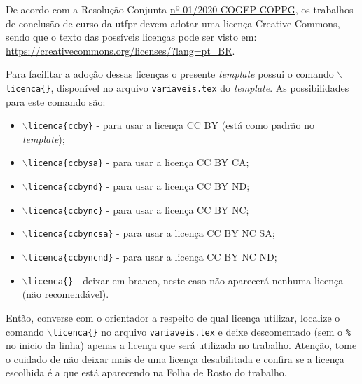 De acordo com a Resolução Conjunta \href{https://sei.utfpr.edu.br/sei/publicacoes/controlador_publicacoes.php?acao=publicacao_visualizar&id_documento=1811618&id_orgao_publicacao=0}{nº 01/2020 COGEP-COPPG}, os trabalhos de conclusão de curso da \gls{utfpr} devem adotar uma licença Creative Commons, sendo que o texto das possíveis licenças pode ser visto em: \url{https://creativecommons.org/licenses/?lang=pt_BR}.

Para facilitar a adoção dessas licenças o presente \textit{template} possui o comando \texttt{$\backslash$licenca\{\}}, disponível no arquivo \texttt{variaveis.tex} do \textit{template}. As possibilidades para este comando são:

\begin{itemize}
    \item \texttt{$\backslash$licenca\{ccby\}} - para usar a licença CC BY (está como padrão no \textit{template}); 
    \item \texttt{$\backslash$licenca\{ccbysa\}} - para usar a licença CC BY CA;
    \item \texttt{$\backslash$licenca\{ccbynd\}} - para usar a licença CC BY ND;
    \item \texttt{$\backslash$licenca\{ccbync\}} - para usar a licença CC BY NC;
    \item \texttt{$\backslash$licenca\{ccbyncsa\}} - para usar a licença CC BY NC SA;
    \item \texttt{$\backslash$licenca\{ccbyncnd\}} - para usar a licença CC BY NC ND;
    \item \texttt{$\backslash$licenca\{\}} - deixar em branco, neste caso não aparecerá nenhuma licença (não recomendável).
\end{itemize}

Então, converse com o orientador a respeito de qual licença utilizar, localize o comando \texttt{$\backslash$licenca\{\}} no arquivo \texttt{variaveis.tex} e deixe descomentado (sem o \texttt{\%} no inicio da linha) apenas a licença que será utilizada no trabalho. Atenção, tome o cuidado de não deixar mais de uma licença desabilitada e confira se a licença escolhida é a que está aparecendo na Folha de Rosto do trabalho.